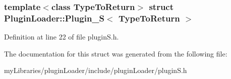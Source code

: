 \subsubsection*{template$<$class Type\+To\+Return$>$\newline
struct Plugin\+Loader\+::\+Plugin\+\_\+\+S$<$ Type\+To\+Return $>$}



Definition at line 22 of file plugin\+S.\+h.



The documentation for this struct was generated from the following file\+:\begin{DoxyCompactItemize}
\item 
my\+Libraries/plugin\+Loader/include/plugin\+Loader/plugin\+S.\+h\end{DoxyCompactItemize}
